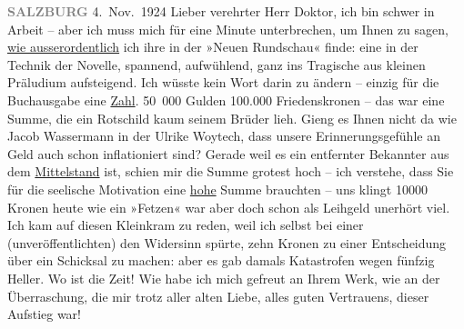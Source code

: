 \pstart
           \raggedleft{}\textcolor{gray}{\textbf{SALZBURG}}{ }4. Nov. 1924\pend
           \vspace{0.5em}
\pstart
           Lieber verehrter Herr Doktor, ich bin schwer in Arbeit – aber ich
               muss mich für eine Minute unterbrechen, um Ihnen zu sagen, \uline{wie ausserordentlich} ich ihre \label{K_L03669-1v}\label{K_L03669-1} in der »Neuen
                  Rundschau« finde: eine \label{K_L03669-2v}\label{K_L03669-2} in der Technik der Novelle, spannend,
               aufwühlend, ganz ins Tragische aus kleinen Präludium aufsteigend. Ich wüsste kein
               Wort darin zu ändern – einzig für die Buchausgabe eine \uline{Zahl}. 50 000 Gulden 100.000 Friedenskronen – das war eine Summe, die ein
               Rotschild kaum seinem Brüder \label{K_L03669-3v}\label{K_L03669-3} lieh. Gieng es Ihnen nicht da wie Jacob Wassermann in der Ulrike Woytech, dass unsere Erinnerungsgefühle an Geld auch
               schon inflationiert sind? Gerade weil es ein entfernter Bekannter aus dem \uline{Mittelstand} ist, schien mir die Summe grotest hoch –
               ich verstehe, dass {\pb}Sie für die seelische
               Motivation eine \uline{hohe} Summe brauchten – uns klingt
               10000 Kronen heute wie ein »Fetzen« war aber doch schon als Leihgeld unerhört viel.
               Ich kam auf diesen Kleinkram zu reden, weil ich selbst bei einer (unveröffentlichten)
                  \label{K_L03669-4v}\label{K_L03669-4} den Widersinn spürte, zehn Kronen zu einer Entscheidung über
               ein Schicksal zu machen: aber es gab damals Katastrofen wegen fünfzig Heller. Wo ist
               die Zeit! Wie habe ich mich gefreut an Ihrem Werk, wie an der Überraschung, die mir trotz aller alten
               Liebe, alles guten Vertrauens, dieser Aufstieg war!\pend
           
